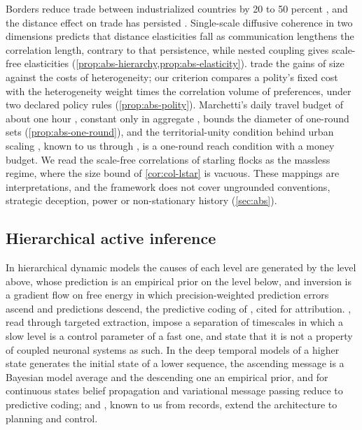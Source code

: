 Borders reduce trade between industrialized countries by 20 to 50 percent \citep{anderson2003gravity}, and the distance effect on trade has persisted \citep{disdier2008puzzling}. Single-scale diffusive coherence in two dimensions predicts that distance elasticities fall as communication lengthens the correlation length, contrary to that persistence, while nested coupling gives scale-free elasticities (\cref{prop:abs-hierarchy,prop:abs-elasticity}). \citet{alesina1997number} trade the gains of size against the costs of heterogeneity; our criterion compares a polity's fixed cost with the heterogeneity weight times the correlation volume of preferences, under two declared policy rules (\cref{prop:abs-polity}). Marchetti's daily travel budget of about one hour \citep{marchetti1994anthropological}, constant only in aggregate \citep{mokhtarian2004ttb}, bounds the diameter of one-round sets (\cref{prop:abs-one-round}), and the territorial-unity condition behind urban scaling \citep{bettencourt2013origins}, known to us through \citet{ribeiro2023mathematical}, is a one-round reach condition with a money budget. We read the scale-free correlations of starling flocks \citep{cavagna2010scale} as the massless regime, where the size bound of \cref{cor:col-lstar} is vacuous. These mappings are interpretations, and the framework does not cover ungrounded conventions, strategic deception, power or non-stationary history (\cref{sec:abs}).

\subsection{Hierarchical active inference}\label{sec:rel-hierarchy}

In hierarchical dynamic models \citep{friston2008hierarchical} the causes of each level are generated by the level above, whose prediction is an empirical prior on the level below, and inversion is a gradient flow on free energy in which precision-weighted prediction errors ascend and predictions descend, the predictive coding of \citet{rao1999predictive}, cited for attribution. \citet{kiebel2008hierarchy}, read through targeted extraction, impose a separation of timescales in which a slow level is a control parameter of a fast one, and state that it is not a property of coupled neuronal systems as such. In the deep temporal models of \citet{friston2017graphical} a higher state generates the initial state of a lower sequence, the ascending message is a Bayesian model average and the descending one an empirical prior, and for continuous states belief propagation and variational message passing reduce to predictive coding; \citet{friston2017deep} and \citet{pezzulo2018hierarchical}, known to us from records, extend the architecture to planning and control.


